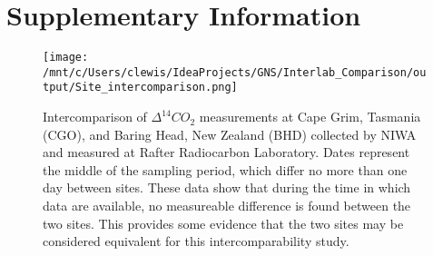 \section{Supplementary Information}
\label{sec:conc}
\begin{figure}[h!]
  \caption{ Intercomparison of ${\Delta^{14}CO_{2}}$ measurements  at Cape Grim, Tasmania (CGO), and Baring Head, New Zealand (BHD) collected by NIWA and measured at Rafter Radiocarbon Laboratory. Dates represent the middle of the sampling period, which differ no more than one day between sites. These data show that during the time in which data are available, no measureable difference is found between the two sites. This provides some evidence that the two sites may be considered equivalent for this intercomparability study.}
  \texttt{[image: /mnt/c/Users/clewis/IdeaProjects/GNS/Interlab\_Comparison/output/Site\_intercomparison.png]}
\label{fig:bhdvcgo}
\end{figure}
